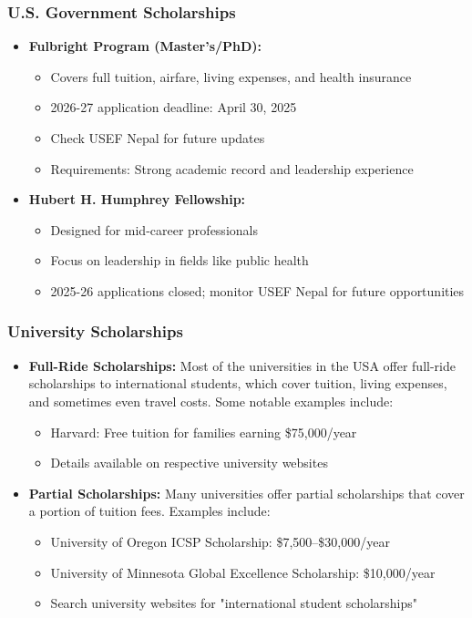 \subsubsection{U.S. Government Scholarships}
\begin{itemize}
    \item \textbf{Fulbright Program (Master's/PhD):}
    \begin{itemize}
        \item Covers full tuition, airfare, living expenses, and health insurance
        \item 2026-27 application deadline: April 30, 2025
        \item Check USEF Nepal for future updates
        \item Requirements: Strong academic record and leadership experience
    \end{itemize}

    \item \textbf{Hubert H. Humphrey Fellowship:}
    \begin{itemize}
        \item Designed for mid-career professionals
        \item Focus on leadership in fields like public health
        \item 2025-26 applications closed; monitor USEF Nepal for future opportunities
    \end{itemize}
\end{itemize}

\subsubsection{University Scholarships}
\begin{itemize}
    \item \textbf{Full-Ride Scholarships:}
    Most of the universities in the USA offer full-ride scholarships to international students, which cover tuition, living expenses, and sometimes even travel costs. Some notable examples include:
    \begin{itemize}
        \item Harvard: Free tuition for families earning \$75,000/year
        \item Details available on respective university websites
    \end{itemize}

    \item \textbf{Partial Scholarships:}
    Many universities offer partial scholarships that cover a portion of tuition fees. Examples include:
    \begin{itemize}
        \item University of Oregon ICSP Scholarship: \$7,500--\$30,000/year
        \item University of Minnesota Global Excellence Scholarship: \$10,000/year
        \item Search university websites for "international student scholarships"
    \end{itemize}
\end{itemize}

